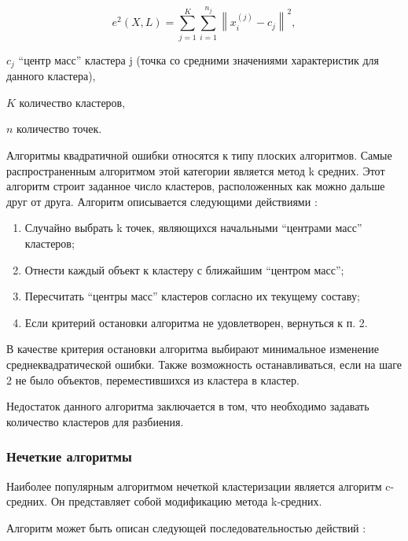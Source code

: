 \begin{equation}
\label{eq:e2}
e^2\left(X,L\right)=\sum_{j=1}^{K}\sum_{i=1}^{n_j}\left \| x_i^{(j)}-c_j \right \|^2,
\end{equation}
\begin{eqexpl}[15mm]
\item{$c_j$} ``центр масс'' кластера j (точка со средними значениями характеристик для данного кластера),
\item{$K$} количество кластеров,
\item{$n$} количество точек.
\end{eqexpl}

Алгоритмы квадратичной ошибки относятся к типу плоских алгоритмов. Самые распространенным алгоритмом этой категории является метод k\- средних. Этот алгоритм строит заданное число кластеров, расположенных как можно дальше друг от друга. Алгоритм описывается следующими действиями \cite{clasters}:

\begin{enumerate}[leftmargin=1.6\parindent]
\item Случайно выбрать k точек, являющихся начальными ``центрами масс'' кластеров;
\item Отнести каждый объект к кластеру с ближайшим ``центром масс'';
\item Пересчитать ``центры масс'' кластеров согласно их текущему составу;
\item Если критерий остановки алгоритма не удовлетворен, вернуться к п. 2.
\end{enumerate}

В качестве критерия остановки алгоритма выбирают минимальное изменение среднеквадратической ошибки. Также возможность останавливаться, если на шаге 2 не было объектов, переместившихся из кластера в кластер. \cite{clasters}

Недостаток данного алгоритма заключается в том, что необходимо задавать количество кластеров для разбиения. \cite{clasters}

\subsubsection{Нечеткие алгоритмы}
Наиболее популярным алгоритмом нечеткой кластеризации является алгоритм c-средних. Он представляет собой модификацию метода k-средних. \cite{clasters}

Алгоритм может быть описан следующей последовательностью действий \cite{clasters}:

